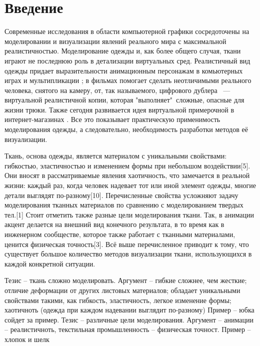 \chapter*{Введение}

Современные исследования в области компьютерной графики сосредоточены на
моделировании и визуализации явлений реального мира с максимальной
реалистичностью. Моделирование одежды и, как более общего случая, ткани играют
не последнюю роль в детализации виртуальных сред.\cite{Simnett2012RealtimeSA}
Реалистичный вид одежды придает выразительности анимационным персонажам в
комьютерных играх и мультипликации \cite{Zurdo2013AnimatingWB}; в фильмах
помогает сделать неотличимыми реального человека, снятого на камеру, от, так
называемого, цифрового дублера ~--- виртуальной реалистичной копии, которая
"выполняет"\ сложные,  опасные для жизни трюки. \cite{Stuyck2018ClothSF} Также
сегодня развивается идея виртуальной примерочной в интернет-магазинах
\cite{Keckeisen2005PhysicalCS}. Все это показывает практическую применимость
моделирования одежды, а следовательно, необходимость разработки методов её
визуализации.

Ткань, основа одежды, является материалом с уникальными
свойствами: гибкостью, эластичностью и изменением формы при
небольшом воздействии[5]. Они вносят в рассматриваемые
явления хаотичность, что  замечается в реальной жизни: каждый
раз, когда человек надевает тот или иной элемент одежды,
многие детали выглядят по-разному[10].  Перечисленные свойства
усложняют задачу моделирования тканных материалов по
сравнению с моделированием твердых тел.[1] Стоит отметить
также разные цели моделирования ткани. Так, в анимации акцент делается на внешний вид конечного результата, в то время как в инженерном сообществе, которое также работает с тканными материалами, ценится физическая точность[3]. Всё выше перечисленное приводит к тому, что существует большое количество методов визуализации ткани, использующихся в каждой конкретной ситуации.


Тезис -- ткань сложно моделировать.
Аргумент -- гибкие сложнее, чем жесткие; отличие деформации от других листовых материалов; обладает уникальными свойствами такими, как гибкость, эластичность, легкое изменение формы; хаотичноть (одежда при каждом надевании выглядит по-разному)
Пример -- юбка сойдет за пример.
Тезис -- различные цели моделирования.
Аргумент -- анимации -- реалистичноть, текстильная промышленность -- физическая точност.
Пример -- хлопок и шелк

